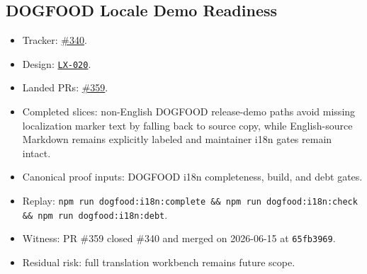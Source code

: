 \subsection{DOGFOOD Locale Demo Readiness}\label{record-261-dogfood-locale-demo-readiness}

\begin{itemize}
\tightlist
\item
  Tracker: \href{https://github.com/flyingrobots/bijou/issues/340}{\#340}.
\item
  Design: \href{https://github.com/flyingrobots/bijou/blob/cbd70612140e7a450d764b3c7be1c6af878b99bc/docs/design/LX-020-dogfood-locale-demo-readiness.md}{\texttt{L\allowbreak{}X\allowbreak{}-\allowbreak{}0\allowbreak{}2\allowbreak{}0}}.
\item
  Landed PRs: \href{https://github.com/flyingrobots/bijou/pull/359}{\#359}.
\item
  Completed slices: non-English DOGFOOD release-demo paths avoid missing localization marker text by falling back to source copy, while English-source Markdown remains explicitly labeled and maintainer i18n gates remain intact.
\item
  Canonical proof inputs: DOGFOOD i18n completeness, build, and debt gates.
\item
  Replay: \texttt{n\allowbreak{}p\allowbreak{}m\allowbreak{} \allowbreak{}r\allowbreak{}u\allowbreak{}n\allowbreak{} \allowbreak{}d\allowbreak{}o\allowbreak{}g\allowbreak{}f\allowbreak{}o\allowbreak{}o\allowbreak{}d\allowbreak{}:\allowbreak{}i\allowbreak{}1\allowbreak{}8\allowbreak{}n\allowbreak{}:\allowbreak{}c\allowbreak{}o\allowbreak{}m\allowbreak{}p\allowbreak{}l\allowbreak{}e\allowbreak{}t\allowbreak{}e\allowbreak{} \allowbreak{}\&\allowbreak{}\&\allowbreak{} \allowbreak{}n\allowbreak{}p\allowbreak{}m\allowbreak{} \allowbreak{}r\allowbreak{}u\allowbreak{}n\allowbreak{} \allowbreak{}d\allowbreak{}o\allowbreak{}g\allowbreak{}f\allowbreak{}o\allowbreak{}o\allowbreak{}d\allowbreak{}:\allowbreak{}i\allowbreak{}1\allowbreak{}8\allowbreak{}n\allowbreak{}:\allowbreak{}c\allowbreak{}h\allowbreak{}e\allowbreak{}c\allowbreak{}k\allowbreak{} \allowbreak{}\&\allowbreak{}\&\allowbreak{} \allowbreak{}n\allowbreak{}p\allowbreak{}m\allowbreak{} \allowbreak{}r\allowbreak{}u\allowbreak{}n\allowbreak{} \allowbreak{}d\allowbreak{}o\allowbreak{}g\allowbreak{}f\allowbreak{}o\allowbreak{}o\allowbreak{}d\allowbreak{}:\allowbreak{}i\allowbreak{}1\allowbreak{}8\allowbreak{}n\allowbreak{}:\allowbreak{}d\allowbreak{}e\allowbreak{}b\allowbreak{}t}.
\item
  Witness: PR \#359 closed \#340 and merged on 2026-06-15 at \texttt{6\allowbreak{}5\allowbreak{}f\allowbreak{}b\allowbreak{}3\allowbreak{}9\allowbreak{}6\allowbreak{}9}.
\item
  Residual risk: full translation workbench remains future scope.
\end{itemize}

